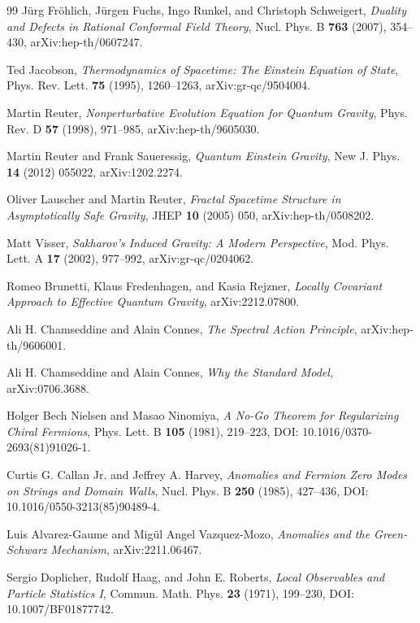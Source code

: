 \documentclass[11pt,a4paper]{article}
\begin{document}
\begin{thebibliography}{99}
Jürg Fröhlich, Jürgen Fuchs, Ingo Runkel, and Christoph Schweigert,
\emph{Duality and Defects in Rational Conformal Field Theory},
Nucl. Phys. B \textbf{763} (2007), 354--430,
arXiv:hep-th/0607247.

Ted Jacobson,
\emph{Thermodynamics of Spacetime: The Einstein Equation of State},
Phys. Rev. Lett. \textbf{75} (1995), 1260--1263,
arXiv:gr-qc/9504004.

Martin Reuter,
\emph{Nonperturbative Evolution Equation for Quantum Gravity},
Phys. Rev. D \textbf{57} (1998), 971--985,
arXiv:hep-th/9605030.

Martin Reuter and Frank Saueressig,
\emph{Quantum Einstein Gravity},
New J. Phys. \textbf{14} (2012) 055022,
arXiv:1202.2274.

Oliver Lauscher and Martin Reuter,
\emph{Fractal Spacetime Structure in Asymptotically Safe Gravity},
JHEP \textbf{10} (2005) 050,
arXiv:hep-th/0508202.

Matt Visser,
\emph{Sakharov's Induced Gravity: A Modern Perspective},
Mod. Phys. Lett. A \textbf{17} (2002), 977--992,
arXiv:gr-qc/0204062.

Romeo Brunetti, Klaus Fredenhagen, and Kasia Rejzner,
\emph{Locally Covariant Approach to Effective Quantum Gravity},
arXiv:2212.07800.

Ali H. Chamseddine and Alain Connes,
\emph{The Spectral Action Principle},
arXiv:hep-th/9606001.

Ali H. Chamseddine and Alain Connes,
\emph{Why the Standard Model},
arXiv:0706.3688.

Holger Bech Nielsen and Masao Ninomiya,
\emph{A No-Go Theorem for Regularizing Chiral Fermions},
Phys. Lett. B \textbf{105} (1981), 219--223,
DOI: 10.1016/0370-2693(81)91026-1.

Curtis G. Callan Jr. and Jeffrey A. Harvey,
\emph{Anomalies and Fermion Zero Modes on Strings and Domain Walls},
Nucl. Phys. B \textbf{250} (1985), 427--436,
DOI: 10.1016/0550-3213(85)90489-4.

Luis Alvarez-Gaume and Migül Angel Vazquez-Mozo,
\emph{Anomalies and the Green-Schwarz Mechanism},
arXiv:2211.06467.


Sergio Doplicher, Rudolf Haag, and John E. Roberts,
\emph{Local Observables and Particle Statistics I},
Commun. Math. Phys. \textbf{23} (1971), 199--230,
DOI: 10.1007/BF01877742.


\end{thebibliography}
\end{document}
